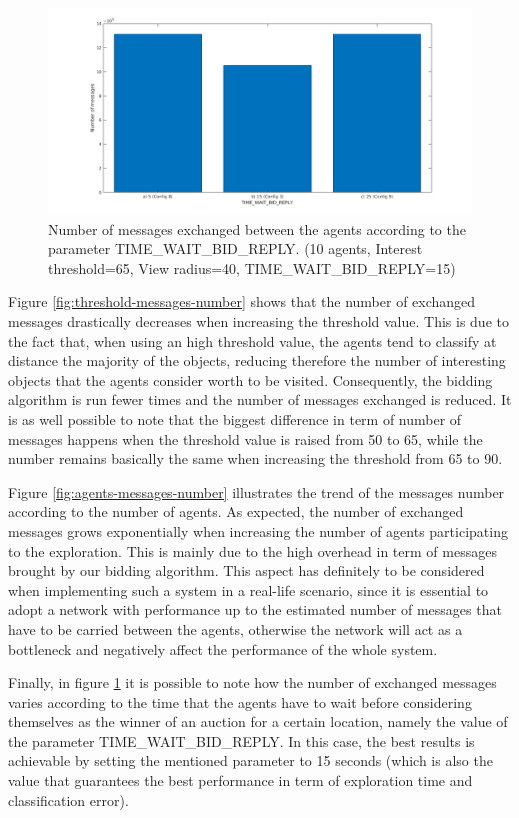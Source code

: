 \documentclass[a4paper, 10pt, conference]{ieeeconf}      %
\begin{document}
\begin{figure}[H]
	\centering
	\includegraphics[width=1\linewidth]{img/time_messages_number.png}
	\caption{Number of messages exchanged between the agents according to the parameter TIME\_WAIT\_BID\_REPLY. (10 agents, Interest threshold=65, View radius=40, TIME\_WAIT\_BID\_REPLY=15)}
	\label{fig:bid-time-messages-number}
\end{figure}

Figure \ref{fig:threshold-messages-number} shows that the number of exchanged messages drastically decreases when increasing the threshold value. This is due to the fact that, when using an high threshold value, the agents tend to classify at distance the majority of the objects, reducing therefore the number of interesting objects that the agents consider worth to be visited. Consequently, the bidding algorithm is run fewer times and the number of messages exchanged is reduced. It is as well possible to note that the biggest difference in term of number of messages happens when the threshold value is raised from 50 to 65, while the number remains basically the same when increasing the threshold from 65 to 90. 

Figure \ref{fig:agents-messages-number} illustrates the trend of the messages number according to the number of agents. As expected, the number of exchanged messages grows exponentially when increasing the number of agents participating to the exploration. This is mainly due to the high overhead in term of messages brought by our bidding algorithm. This aspect has definitely to be considered when implementing such a system in a real-life scenario, since it is essential to adopt a network with performance up to the estimated number of messages that have to be carried between the agents, otherwise the network will act as a bottleneck and negatively affect the performance of the whole system.  

Finally, in figure \ref{fig:bid-time-messages-number} it is possible to note how the number of exchanged messages varies according to the time that the agents have to wait before considering themselves as the winner of an auction for a certain location, namely the value of the parameter TIME\_WAIT\_BID\_REPLY. In this case, the best results is achievable by setting the mentioned parameter to 15 seconds (which is also the value that guarantees the best performance in term of exploration time and classification error). 
\end{document}
